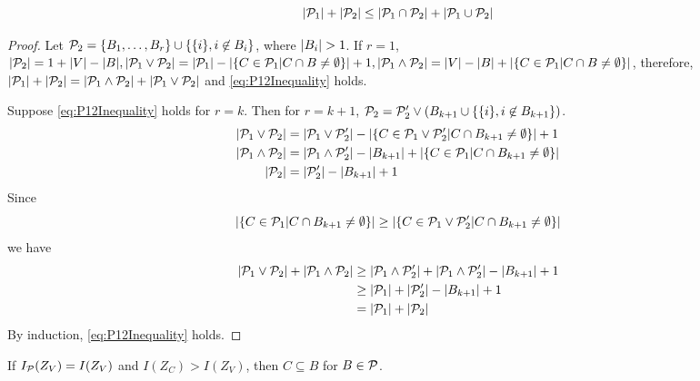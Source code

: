 \ifshowIrrelevant
\begin{lemma}
\begin{equation}\label{eq:P12Inequality}
\abs{\P_1} + \abs{\P_2} \leq \abs{\P_1 \cap \P_2} + \abs{\P_1 \cup \P_2}
\end{equation}
\end{lemma}
\begin{proof}
Let $\P_2 = \{B_1, \dots, B_r\} \cup \{\{i\}, i\not\in B_i\}$, where $\abs{B_i}>1$.
If $r=1$, 
$\abs{\P_2} = 1+ \abs{V} - \abs{B}, \abs{\P_1 \vee \P_2} = \abs{\P_1} - \abs{\{C\in \P_1 | C\cap B \neq \emptyset \}}+1, \abs{\P_1 \wedge \P_2} = \abs{V} - \abs{B} + \abs{\{C\in \P_1 | C\cap B \neq \emptyset \}}$,
 therefore, $\abs{\P_1} + \abs{\P_2} = \abs{\P_1 \wedge \P_2} + \abs{\P_1 \vee \P_2}$
and \eqref{eq:P12Inequality} holds.

Suppose \eqref{eq:P12Inequality} holds for $r=k$. Then for $r=k+1$,
$\P_2 = \P'_2 \vee (B_{k+1} \cup \{ \{i\}, i\not\in B_{k+1} \})$.
\begin{align*}
\abs{\P_1 \vee \P_2} & = \abs{\P_1 \vee \P'_2} - \abs{\{C\in \P_1 \vee \P'_2 | C\cap B_{k+1}\neq \emptyset \}}+1 \\
\abs{\P_1 \wedge \P_2} & = \abs{\P_1 \wedge \P'_2} - \abs{B_{k+1}} +  \abs{\{C\in \P_1 | C\cap B_{k+1}\neq \emptyset \}} \\
\abs{\P_2} & = \abs{\P'_2} -\abs{B_{k+1}} +1
\end{align*}
Since 
$$
  \abs{\{C\in \P_1 | C\cap B_{k+1}\neq \emptyset \}}
  \geq
  \abs{\{C\in \P_1 \vee \P'_2 | C\cap B_{k+1}\neq \emptyset \}}
$$
we have
\begin{align*}
	\abs{\P_1 \vee \P_2} + \abs{\P_1 \wedge \P_2} & \geq \abs{\P_1 \wedge \P'_2} + \abs{\P_1 \wedge \P'_2}
	- \abs{B_{k+1}} + 1 \\
	& \geq \abs{\P_1} + \abs{\P'_2} - \abs{B_{k+1}} + 1  \\
	& = \abs{\P_1} + \abs{\P_2}	
\end{align*}
By induction, \eqref{eq:P12Inequality} holds.
\end{proof}
\fi
\begin{lemma}\label{lem:LargeIZV}
	If $I_{\P}(Z_V)=I(Z_V)$ and $I(Z_C) > I(Z_V)$, then $C\subseteq B$ for $B \in \P$.
\end{lemma}
